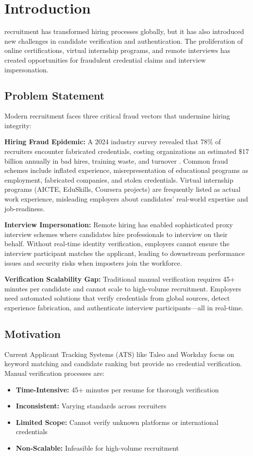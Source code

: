\documentclass[journal]{IEEEtran}
\begin{document}
\section{Introduction}
 recruitment has transformed hiring processes globally, but it has also introduced new challenges in candidate verification and authentication. The proliferation of online certifications, virtual internship programs, and remote interviews has created opportunities for fraudulent credential claims and interview impersonation.

\subsection{Problem Statement}
Modern recruitment faces three critical fraud vectors that undermine hiring integrity:

\textbf{Hiring Fraud Epidemic:} A 2024 industry survey revealed that 78\% of recruiters encounter fabricated credentials, costing organizations an estimated \$17 billion annually in bad hires, training waste, and turnover \cite{recruitment_survey_2024}. Common fraud schemes include inflated experience, misrepresentation of educational programs as employment, fabricated companies, and stolen credentials. Virtual internship programs (AICTE, EduSkills, Coursera projects) are frequently listed as actual work experience, misleading employers about candidates' real-world expertise and job-readiness.

\textbf{Interview Impersonation:} Remote hiring has enabled sophisticated proxy interview schemes where candidates hire professionals to interview on their behalf. Without real-time identity verification, employers cannot ensure the interview participant matches the applicant, leading to downstream performance issues and security risks when imposters join the workforce.

\textbf{Verification Scalability Gap:} Traditional manual verification requires 45+ minutes per candidate and cannot scale to high-volume recruitment. Employers need automated solutions that verify credentials from global sources, detect experience fabrication, and authenticate interview participants—all in real-time.

\subsection{Motivation}
Current Applicant Tracking Systems (ATS) like Taleo and Workday focus on keyword matching and candidate ranking but provide no credential verification. Manual verification processes are:
\begin{itemize}
\item \textbf{Time-Intensive:} 45+ minutes per resume for thorough verification
\item \textbf{Inconsistent:} Varying standards across recruiters
\item \textbf{Limited Scope:} Cannot verify unknown platforms or international credentials
\item \textbf{Non-Scalable:} Infeasible for high-volume recruitment
\end{itemize}
\end{document}
